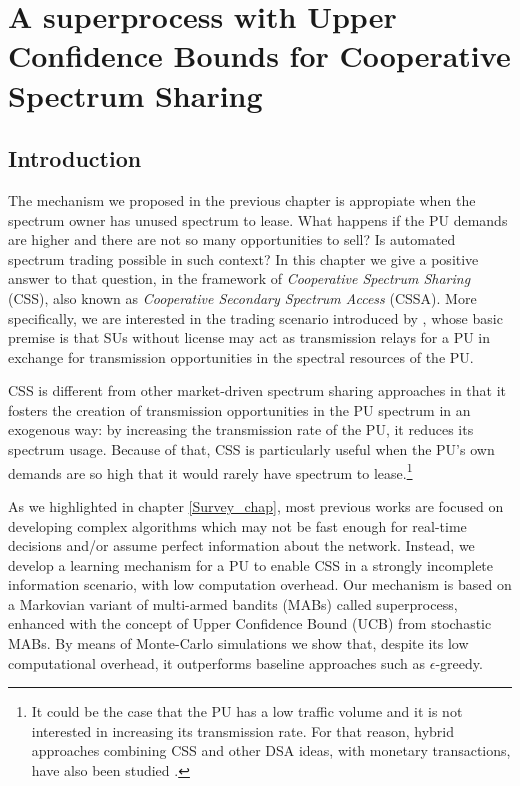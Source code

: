 \graphicspath{ {img/MAB_CSSA/} }
\chapter[A superprocess with Upper Confidence Bounds for Cooperative Spectrum Sharing][A superprocess with UCB for CSS]{A superprocess with Upper Confidence Bounds for Cooperative Spectrum Sharing}\label{MAB_CSSA_chap}

\section{Introduction}
The mechanism we proposed in the previous chapter is appropiate when the spectrum owner has unused spectrum to lease. What happens if the PU demands are higher and there are not so many opportunities to sell? Is automated spectrum trading possible in such context? In this chapter we give a positive answer to that question, in the framework of \textit{Cooperative Spectrum Sharing} (CSS), also known as \textit{Cooperative Secondary Spectrum Access} (CSSA). 
More specifically, we are interested in the trading scenario introduced by \cite{ref:Simeone2008}, whose basic premise is that SUs without license may act as transmission relays for a PU in exchange for transmission opportunities in the spectral resources of the PU.

CSS is different from other market-driven spectrum sharing approaches in that it fosters the creation of transmission opportunities in the PU spectrum in an exogenous way: by increasing the transmission rate of the PU, it reduces its spectrum usage. 
Because of that, CSS is particularly useful when the PU's own demands are so high that it would rarely have spectrum to lease.\footnote{It could be the case that the PU has a low traffic volume and it is not interested in increasing its transmission rate. 
For that reason, hybrid approaches combining CSS and other DSA ideas, with monetary transactions, have also been studied \cite{ref:Zhang2009,ref:Zhang2012_Fair}.}

As we highlighted in chapter \ref{Survey_chap}, most previous works are focused on developing complex algorithms which may not be fast enough for real-time decisions and/or assume perfect information about the network. Instead, we develop a learning mechanism for a PU to enable CSS in a strongly incomplete information scenario, with low computation overhead. Our mechanism is based on a Markovian variant of multi-armed bandits (MABs) called superprocess, enhanced with the concept of Upper Confidence Bound (UCB) from stochastic MABs. By means of Monte-Carlo simulations we show that, despite its low computational overhead, it outperforms baseline approaches such as $\epsilon$-greedy.

